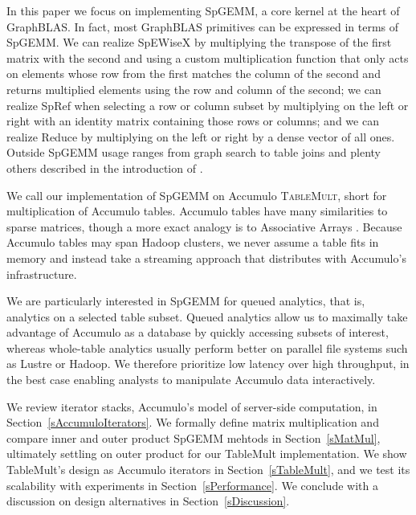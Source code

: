 In this paper we focus on implementing SpGEMM, a core kernel at the heart of GraphBLAS.
In fact, most GraphBLAS primitives can be expressed in terms of SpGEMM.
We can realize SpEWiseX by multiplying the transpose of the first matrix with the second
and using a custom multiplication function that only acts on elements whose row from the first 
matches the column of the second and returns multiplied elements using the row and column of the second;
we can realize SpRef when selecting a row or column subset by multiplying on the left or right with an identity matrix 
containing those rows or columns;
and we can realize Reduce by multiplying on the left or right %
by a dense vector of all ones.
Outside SpGEMM usage ranges from graph search \cite{kepner2011graph} to table joins \cite{cohen2009mad} 
and plenty others described in the introduction of \cite{bulucc2010highly}.

We call our implementation of SpGEMM on Accumulo \textsc{TableMult}, short for multiplication of Accumulo tables.
Accumulo tables have many similarities to sparse matrices, though a more exact analogy is to Associative Arrays 
\cite{kepner2014gabb}.
Because Accumulo tables may span Hadoop clusters,
we never assume a table fits in memory
and instead take a streaming approach that distributes with Accumulo's infrastructure.

We are particularly interested in SpGEMM for queued analytics, that is, analytics on a selected table subset.  
Queued analytics allow us to maximally take advantage of Accumulo as a database 
by quickly accessing subsets of interest, 
whereas whole-table analytics usually perform better on parallel file systems such as Lustre or Hadoop.
We therefore prioritize low latency over high throughput, %
in the best case enabling analysts to manipulate Accumulo data interactively.


We review iterator stacks, Accumulo's model of server-side computation, in Section~\ref{sAccumuloIterators}.
We formally define matrix multiplication and compare inner and outer product SpGEMM mehtods
in Section~\ref{sMatMul}, ultimately settling on outer product for our TableMult implementation.
We show TableMult's design as Accumulo iterators in Section~\ref{sTableMult},
and we test its scalability with experiments in Section~\ref{sPerformance}.
We conclude with a discussion on design alternatives in Section~\ref{sDiscussion}.

